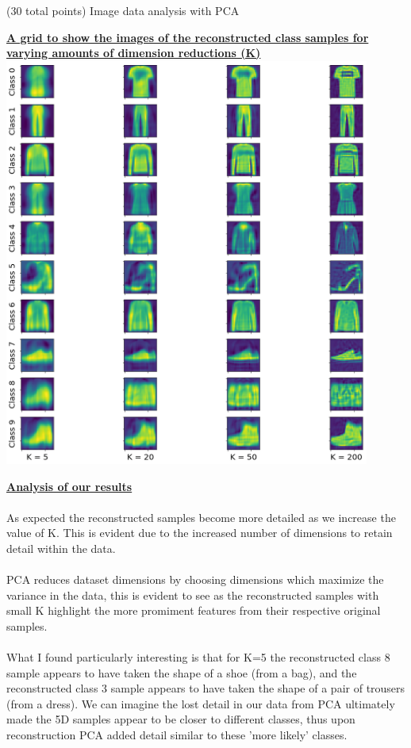 \documentclass[12pt]{article}
\begin{document}
\begin{question}{(30 total points) Image data analysis with PCA}
\begin{subquestion}
   

      \begin{answerbox}{49.5em}
        \begin{center}
        \textbf{\underline{A grid to show the images of the reconstructed class samples for}}\\
        \textbf{\underline{varying amounts of dimension reductions (K)}}
        \vspace{0.3cm}\\
         \includegraphics[width=0.9\textwidth]{images/q17.png}
        \end{center}
        \footnotesize{\textbf{\underline{Analysis of our results}}}\\
        \scriptsize{
\\
        As expected the reconstructed samples become more detailed as we increase the value of K. This is evident due to the increased number of dimensions to retain detail within the data.\\
\\
        PCA reduces dataset dimensions by choosing dimensions which maximize the variance in the data, this is evident to see as the reconstructed samples with small K highlight the more promiment features from their respective original samples.\\
\\
        What I found particularly interesting is that for K=5 the reconstructed class 8 sample appears to have taken the shape of a shoe (from a bag), and the reconstructed class 3 sample appears to have taken the shape of a pair of trousers (from a dress). We can imagine the lost detail in our data from PCA ultimately made the 5D samples appear to be closer to different classes, thus upon reconstruction PCA added detail similar to these 'more likely' classes.}
      \end{answerbox}
  



\end{subquestion}
\end{question}
\end{document}
